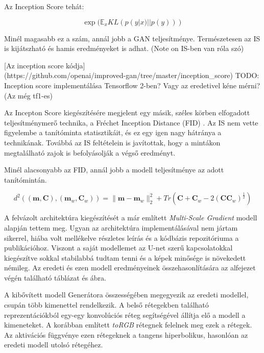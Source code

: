 Az Inception Score tehát:

$$ \exp(\mathbb{E}_x KL(p(y|x)||p(y))) $$

Minél magasabb ez a szám, annál jobb a GAN teljesítménye. Természetesen az IS is kijátszható és hamis eredményeket is adhat. (Note on IS-ben van róla szó)


[Az inception score kódja]\\(https://github.com/openai/improved-gan/tree/master/inception\_score)
TODO: Inception score implementálása Tensorflow 2-ben? Vagy az eredetivel kéne mérni? (Az még tf1-es)


Az Incepton Score kiegészítésére megjelent egy másik, széles körben elfogadott teljesítménymerő technika, a Fréchet Inception Distance (FID) \cite{heusel2017gans}. Az IS nem vette figyelembe a tanítóminta statisztikáit, és ez egy igen nagy hátránya a technikának. Továbbá az IS feltételein is javítottak, hogy a mintákon megtalálható zajok is befolyásolják a végső eredményt.


Minél alacsonyabb az FID, annál jobb a modell teljesítménye az adott tanítómintán.

$$ d^2((\boldsymbol{m}, \boldsymbol{C}), (\boldsymbol{m}_w, \boldsymbol{C}_w)) = \|\boldsymbol{m} - \boldsymbol{m}_w \|_2^2 + Tr(\boldsymbol{C} + \boldsymbol{C}_w - 2(\boldsymbol{C}\boldsymbol{C}_w)^{\frac{1}{2}}) $$





A felvázolt architektúra kiegészítését a már említett \textit{Multi-Scale Gradient} \cite{karnewar2020msg} modell alapján tettem meg. Ugyan az architektúra implementálásával nem jártam sikerrel, hiába volt mellékelve részletes leírás és a kódbázis repozitóriuma a publikációhoz. Viszont a saját modellemet az U-net szerű kapcsolatokkal kiegészítve sokkal stabilabbá tudtam tenni és a képek minősége is növekedett némileg. Az eredeti és ezen modell eredményeinek összehasonlítására az alfejezet végén található táblázat és ábra.

A kibővített modell Generátora összességében megegyezik az eredeti modellel, csupán több kimenettel rendelkezik. A belső rétegekben található reprezentációkból egy-egy konvolúciós réteg segítségével állítja elő a modell a kimeneteket. A korábban említett \textit{toRGB} rétegnek felelnek meg ezek a rétegek. Az aktivációs függvénye ezen rétegeknek a tangens hiperbolikus, hasonlóan az eredeti modell utolsó rétegéhez.

